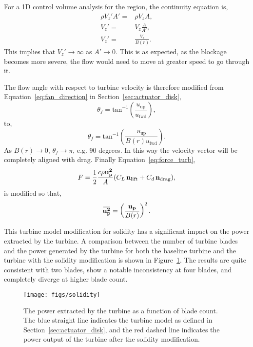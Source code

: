 For a 1D control volume analysis for the region, the continuity
equation is, 
\begin{eqnarray}
 \rho V_z' A' =& \rho V_z A,\\
 V_z' =& V_z \frac{A}{A'}, \\
 V_z' =& \frac{V_z}{B(r)}.
\end{eqnarray}
This implies that $V_z' \rightarrow \infty$ as $A' \rightarrow
0$. This is as expected, as the blockage becomes more severe, the flow
would need to move at greater speed to go through it. 

The flow angle with respect to turbine velocity is therefore modified 
from Equation~\ref{eq:fan_direction} in
Section~\ref{sec:actuator_disk},
\begin{equation}
 \theta_f = \text{tan}^{-1}(\frac{u_{\text{up}}}{ u_{\text{fwd}}}),
\end{equation}
to,
\begin{equation}
 \theta_f = \text{tan}^{-1}(\frac{ u_{\text{up}}}{B(r) u_{\text{fwd}}}). 
\end{equation}
As $B(r) \rightarrow 0$, $\theta_f \rightarrow \pi$, e.g. 90 degrees. In
this way the velocity vector will be completely aligned with
drag. Finally Equation~\ref{eq:force_turb},  
\begin{equation}
 F = \frac{1}{2}\frac{c \rho {\bf u_p^2}}{A}(C_L \, {\bf n_{\text{lift}}} +
  C_d \,
   {\bf n_{\text{drag}}}),
\end{equation}
is modified so that, 
\begin{equation}
 \overbar {\bf u_p^{2}} = \left(\frac{{\bf u_p}}{B(r)}\right)^2.
\end{equation}

This turbine model modification for solidity has a significant impact on
the power extracted by the turbine. A comparison between the number of
turbine blades and the power generated by the turbine for both the
baseline turbine and the turbine with the solidity modification is shown in
Figure~\ref{fig:turbine_solidity}. The results are quite consistent with
two blades, show a notable inconsistency at four blades, and completely
diverge at higher blade count. 

  \begin{figure}[!htb]
   \begin{center}
    \texttt{[image: figs/solidity]}
    \caption{The power extracted by the turbine as a function of blade
    count. The blue straight line indicates the turbine model as defined
    in Section~\ref{sec:actuator_disk}, and the red dashed line
    indicates the power output of the turbine after the solidity
    modification.}
    \label{fig:turbine_solidity}
   \end{center}
  \end{figure}

